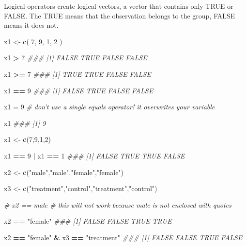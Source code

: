 \documentclass[]{book}
\newenvironment{Shaded}{\begin{snugshade}}{\end{snugshade}}
\newcommand{\CommentTok}[1]{\textcolor[rgb]{0.56,0.35,0.01}{\textit{#1}}}
\newcommand{\DecValTok}[1]{\textcolor[rgb]{0.00,0.00,0.81}{#1}}
\newcommand{\KeywordTok}[1]{\textcolor[rgb]{0.13,0.29,0.53}{\textbf{#1}}}
\newcommand{\NormalTok}[1]{#1}
\newcommand{\OperatorTok}[1]{\textcolor[rgb]{0.81,0.36,0.00}{\textbf{#1}}}
\newcommand{\StringTok}[1]{\textcolor[rgb]{0.31,0.60,0.02}{#1}}
\theoremstyle{definition}
\theoremstyle{definition}
\theoremstyle{definition}
\theoremstyle{remark}
\begin{document}
Logical operators create logical vectors, a vector that contains only
TRUE or FALSE. The TRUE means that the observation belongs to the group,
FALSE means it does not.

\begin{Shaded}
\begin{Highlighting}[]
\NormalTok{x1 <-}\StringTok{ }\KeywordTok{c}\NormalTok{( }\DecValTok{7}\NormalTok{, }\DecValTok{9}\NormalTok{, }\DecValTok{1}\NormalTok{, }\DecValTok{2}\NormalTok{ )}

\NormalTok{x1 }\OperatorTok{>}\StringTok{ }\DecValTok{7}
\CommentTok{### [1] FALSE  TRUE FALSE FALSE}

\NormalTok{x1 }\OperatorTok{>=}\StringTok{ }\DecValTok{7}
\CommentTok{### [1]  TRUE  TRUE FALSE FALSE}

\NormalTok{x1 }\OperatorTok{==}\StringTok{ }\DecValTok{9}
\CommentTok{### [1] FALSE  TRUE FALSE FALSE}

\NormalTok{x1 =}\StringTok{ }\DecValTok{9}  \CommentTok{# don't use a single equals operator!  it overwrites your variable}

\NormalTok{x1}
\CommentTok{### [1] 9}

\NormalTok{x1 <-}\StringTok{ }\KeywordTok{c}\NormalTok{(}\DecValTok{7}\NormalTok{,}\DecValTok{9}\NormalTok{,}\DecValTok{1}\NormalTok{,}\DecValTok{2}\NormalTok{)}

\NormalTok{x1 }\OperatorTok{==}\StringTok{ }\DecValTok{9} \OperatorTok{|}\StringTok{ }\NormalTok{x1 }\OperatorTok{==}\StringTok{ }\DecValTok{1}
\CommentTok{### [1] FALSE  TRUE  TRUE FALSE}


\NormalTok{x2 <-}\StringTok{ }\KeywordTok{c}\NormalTok{(}\StringTok{"male"}\NormalTok{,}\StringTok{"male"}\NormalTok{,}\StringTok{"female"}\NormalTok{,}\StringTok{"female"}\NormalTok{)}

\NormalTok{x3 <-}\StringTok{ }\KeywordTok{c}\NormalTok{(}\StringTok{"treatment"}\NormalTok{,}\StringTok{"control"}\NormalTok{,}\StringTok{"treatment"}\NormalTok{,}\StringTok{"control"}\NormalTok{)}

\CommentTok{# x2 == male  # this will not work because male is not enclosed with quotes}

\NormalTok{x2 }\OperatorTok{==}\StringTok{ "female"}
\CommentTok{### [1] FALSE FALSE  TRUE  TRUE}

\NormalTok{x2 }\OperatorTok{==}\StringTok{ "female"} \OperatorTok{&}\StringTok{ }\NormalTok{x3 }\OperatorTok{==}\StringTok{ "treatment"}
\CommentTok{### [1] FALSE FALSE  TRUE FALSE}
\end{Highlighting}
\end{Shaded}
\end{document}
